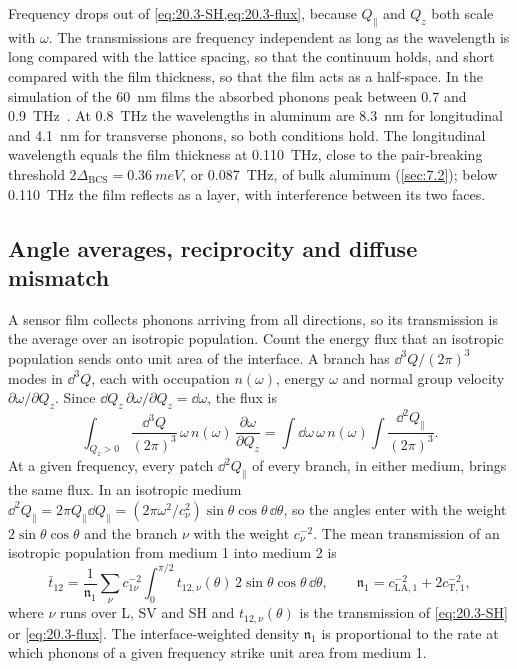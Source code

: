 Frequency drops out of \cref{eq:20.3-SH,eq:20.3-flux}, because $Q_\parallel$ and $Q_z$ both scale with $\omega$. The transmissions are frequency independent as long as the wavelength is long compared with the lattice spacing, so that the continuum holds, and short compared with the film thickness, so that the film acts as a half-space. In the simulation of the \SI{60}{nm} films the absorbed phonons peak between 0.7 and \SI{0.9}{THz}~\cite[Sect.~V]{martinez2019measurements}. At \SI{0.8}{THz} the wavelengths in aluminum are \SI{8.3}{nm} for longitudinal and \SI{4.1}{nm} for transverse phonons, so both conditions hold. The longitudinal wavelength equals the film thickness at \SI{0.110}{THz}, close to the pair-breaking threshold $2\Delta_{\mathrm{BCS}} = \SI{0.36}{meV}$, or \SI{0.087}{THz}, of bulk aluminum (\cref{sec:7.2}); below \SI{0.110}{THz} the film reflects as a layer, with interference between its two faces.

\subsection{Angle averages, reciprocity and diffuse mismatch}\label{sec:20.3-recip}

A sensor film collects phonons arriving from all directions, so its transmission is the average over an isotropic population. Count the energy flux that an isotropic population sends onto unit area of the interface. A branch has $\dd^3Q/(2\pi)^3$ modes in $\dd^3Q$, each with occupation $n(\omega)$, energy $\omega$ and normal group velocity $\partial\omega/\partial Q_z$. Since $\dd Q_z\,\partial\omega/\partial Q_z = \dd\omega$, the flux is
\begin{equation}
  \int_{Q_z > 0}\frac{\dd^3Q}{(2\pi)^3}\,\omega\,n(\omega)\,\frac{\partial\omega}{\partial Q_z} = \int\dd\omega\,\omega\,n(\omega)\int\frac{\dd^2Q_\parallel}{(2\pi)^3} .
  \label{eq:20.3-count}
\end{equation}
At a given frequency, every patch $\dd^2Q_\parallel$ of every branch, in either medium, brings the same flux. In an isotropic medium $\dd^2Q_\parallel = 2\pi Q_\parallel\dd Q_\parallel = (2\pi\omega^2/c_\nu^2)\sin\theta\cos\theta\,\dd\theta$, so the angles enter with the weight $2\sin\theta\cos\theta$ and the branch $\nu$ with the weight $c_\nu^{-2}$. The mean transmission of an isotropic population from medium 1 into medium 2 is
\begin{equation}
  \bar t_{12} = \frac{1}{\mathfrak{n}_1}\sum_\nu c_{1\nu}^{-2}\int_0^{\pi/2}t_{12,\nu}(\theta)\,2\sin\theta\cos\theta\,\dd\theta ,
  \qquad
  \mathfrak{n}_1 = c_{\mathrm{LA},1}^{-2} + 2c_{\mathrm{T},1}^{-2} ,
  \label{eq:20.3-avg}
\end{equation}
where $\nu$ runs over L, SV and SH and $t_{12,\nu}(\theta)$ is the transmission of \cref{eq:20.3-SH} or \cref{eq:20.3-flux}. The interface-weighted density $\mathfrak{n}_1$ is proportional to the rate at which phonons of a given frequency strike unit area from medium 1.

